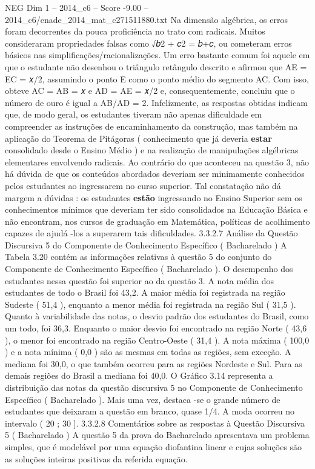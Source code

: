 \begin{textsample}{NEG Dim 1 – 2014\_c6 – Score -9.00 – 2014\_c6/enade\_2014\_mat\_c271511880.txt}
Na dimensão algébrica, os erros foram decorrentes da pouca proficiência no trato com radicais.
Muitos consideraram propriedades falsas como √𝑏2 + 𝑐2 = 𝑏+𝑐, ou cometeram erros básicos nas simplificações/racionalizações.
Um erro bastante comum foi aquele em que o estudante não desenhou o triângulo retângulo descrito e afirmou que AE = EC = 𝑥/2, assumindo o ponto E como o ponto médio do segmento AC.
Com isso, obteve AC = AB = 𝑥 e AD = AE = 𝑥/2 e, consequentemente, concluiu que o número de ouro é igual a AB/AD = 2.
Infelizmente, as respostas obtidas indicam que, de modo geral, os estudantes tiveram não apenas dificuldade em compreender as instruções de encaminhamento da construção, mas também na aplicação do Teorema de Pitágoras ( conhecimento que já deveria \textbf{estar} consolidado desde o Ensino Médio ) e na realização de manipulações algébricas elementares envolvendo radicais.
Ao contrário do que aconteceu na questão 3, não há dúvida de que os conteúdos abordados deveriam ser minimamente conhecidos pelos estudantes ao ingressarem no curso superior.
Tal constatação não dá margem a dúvidas : os estudantes \textbf{estão} ingressando no Ensino Superior sem os conhecimentos mínimos que deveriam ter sido consolidados na Educação Básica e não encontram, nos cursos de graduação em Matemática, políticas de acolhimento capazes de ajudá -los a superarem tais dificuldades. 3.3.2.7 Análise da Questão Discursiva 5 do Componente de Conhecimento Específico ( Bacharelado ) A Tabela 3.20 contém as informações relativas à questão 5 do conjunto do Componente de Conhecimento Específico ( Bacharelado ).
O desempenho dos estudantes nessa questão foi superior ao da questão 3.
A nota média dos estudantes de todo o Brasil foi 43,2.
A maior média foi registrada na região Sudeste ( 51,4 ), enquanto a menor média foi registrada na região Sul ( 31,5 ).
Quanto à variabilidade das notas, o desvio padrão dos estudantes do Brasil, como um todo, foi 36,3.
Enquanto o maior desvio foi encontrado na região Norte ( 43,6 ), o menor foi encontrado na região Centro-Oeste ( 31,4 ).
A nota máxima ( 100,0 ) e a nota mínima ( 0,0 ) são as mesmas em todas as regiões, sem exceção.
A mediana foi 30,0, o que também ocorreu para as regiões Nordeste e Sul.
Para as demais regiões do Brasil a mediana foi 40,0.
O Gráfico 3.14 representa a distribuição das notas da questão discursiva 5 no Componente de Conhecimento Específico ( Bacharelado ).
Mais uma vez, destaca -se o grande número de estudantes que deixaram a questão em branco, quase 1/4.
A moda ocorreu no intervalo ( 20 ; 30 ]. 3.3.2.8 Comentários sobre as respostas à Questão Discursiva 5 ( Bacharelado ) A questão 5 da prova do Bacharelado apresentava um problema simples, que é modelável por uma equação diofantina linear e cujas soluções são as soluções inteiras positivas da referida equação.

\end{textsample}
